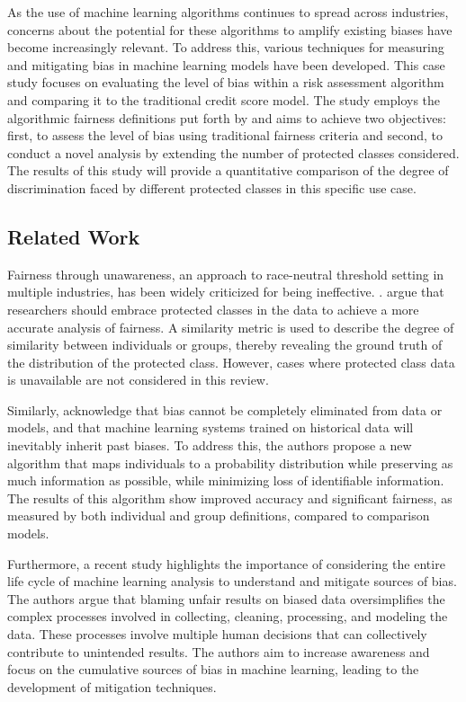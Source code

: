 \documentclass[11pt,]{article}
\begin{document}
As the use of machine learning algorithms continues to spread across
industries, concerns about the potential for these algorithms to amplify
existing biases have become increasingly relevant. To address this,
various techniques for measuring and mitigating bias in machine learning
models have been developed. This case study focuses on evaluating the
level of bias within a risk assessment algorithm and comparing it to the
traditional credit score model. The study employs the algorithmic
fairness definitions put forth by \citet{DBLP:journals/corr/HardtPS16}
and aims to achieve two objectives: first, to assess the level of bias
using traditional fairness criteria and second, to conduct a novel
analysis by extending the number of protected classes considered. The
results of this study will provide a quantitative comparison of the
degree of discrimination faced by different protected classes in this
specific use case.

\hypertarget{related-work}{%
\subsection{Related Work}\label{related-work}}

Fairness through unawareness, an approach to race-neutral threshold
setting in multiple industries, has been widely criticized for being
ineffective. \citet{DBLP:journals/corr/abs-1104-3913}. argue that
researchers should embrace protected classes in the data to achieve a
more accurate analysis of fairness. A similarity metric is used to
describe the degree of similarity between individuals or groups, thereby
revealing the ground truth of the distribution of the protected class.
However, cases where protected class data is unavailable are not
considered in this review.

Similarly, \citet{pmlr-v28-zemel13} acknowledge that bias cannot be
completely eliminated from data or models, and that machine learning
systems trained on historical data will inevitably inherit past biases.
To address this, the authors propose a new algorithm that maps
individuals to a probability distribution while preserving as much
information as possible, while minimizing loss of identifiable
information. The results of this algorithm show improved accuracy and
significant fairness, as measured by both individual and group
definitions, compared to comparison models.

Furthermore, a recent study \citet{DBLP:journals/corr/abs-1901-10002}
highlights the importance of considering the entire life cycle of
machine learning analysis to understand and mitigate sources of bias.
The authors argue that blaming unfair results on biased data
oversimplifies the complex processes involved in collecting, cleaning,
processing, and modeling the data. These processes involve multiple
human decisions that can collectively contribute to unintended results.
The authors aim to increase awareness and focus on the cumulative
sources of bias in machine learning, leading to the development of
mitigation techniques.
\end{document}
